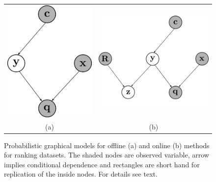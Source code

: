 \documentclass[twoside,11pt]{article}
\begin{document}
\begin{figure}
\centering
\begin{tabular}{cc}
\includegraphics[scale=0.7]{offline-pgm.png} \hspace{0.3in} & \includegraphics[scale=0.7]{online-pgm.png}\\
(a) & (b)
\end{tabular}
\caption{Probabilistic graphical models for offline (a) and online (b) methods for ranking datasets. The shaded nodes are observed variable, arrow implies conditional dependence and rectangles are short hand for replication of the inside nodes. For details see text.}\label{fig:pgm}
\end{figure}
\end{document}
